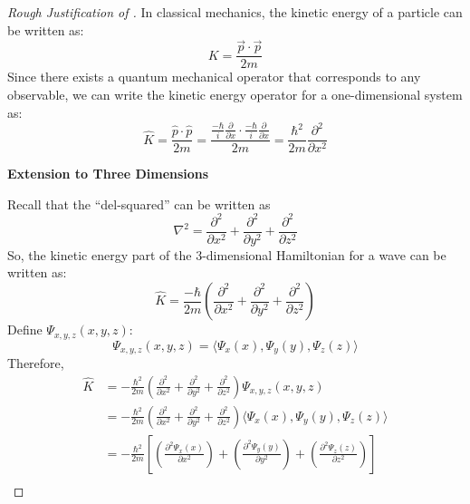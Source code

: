 \begin{proof}[Rough Justification of ]
		In classical mechanics, the kinetic energy of a particle can be written as:
		\begin{equation*}
			K = \frac{\vec{p} \cdot \vec{p}}{2m}
		\end{equation*}
		Since there exists a quantum mechanical operator that corresponds to any observable, we can write the kinetic energy operator for a one-dimensional system as:
		\begin{equation*}
			\widehat{K} = \frac{\hat{p} \cdot \hat{p}}{2m}
			= \frac{\frac{-\hbar}{i} \frac{\partial}{\partial x} \cdot \frac{-\hbar}{i} \frac{\partial}{\partial x}}{2m}
			= \frac{\hbar^{2}}{2m} \frac{\partial^{2}}{\partial x^{2}}
		\end{equation*}
		\begin{center}
			\textbf{\Large Extension to Three Dimensions}
		\end{center}
		Recall that the ``del-squared'' can be written as
		\begin{equation*}
			\nabla^{2} = \frac{\partial^{2}}{\partial x^{2}} + \frac{\partial^{2}}{\partial y^{2}} + \frac{\partial^{2}}{\partial z^{2}}
		\end{equation*}
		So, the kinetic energy part of the 3-dimensional Hamiltonian for a wave can be written as:
		\begin{equation*}
			\widehat{K} =  \frac{-\hbar}{2m} \left( \frac{\partial^{2}}{\partial x^{2}} + \frac{\partial^{2}}{\partial y^{2}} + \frac{\partial^{2}}{\partial z^{2}} \right)
		\end{equation*}
		Define $\Psi_{x,y,z} \left( x,y,z \right)$:
		\begin{equation*}
			\Psi_{x,y,z} \left( x,y,z \right) = \langle \Psi_{x} \left( x \right),\Psi_{y} \left( y \right),\Psi_{z} \left( z \right) \rangle
		\end{equation*}
		Therefore, 
		\begin{align*}
			\widehat{K}
			&= -\frac{\hbar^{2}}{2m} \left( \frac{\partial^{2}}{\partial x^{2}} + \frac{\partial^{2}}{\partial y^{2}}  + \frac{\partial^{2}}{\partial z^{2}} \right) \Psi_{x,y,z} \left( x,y,z \right) \\
			&= -\frac{\hbar^{2}}{2m} \left( \frac{\partial^{2}}{\partial x^{2}} + \frac{\partial^{2}}{\partial y^{2}}  + \frac{\partial^{2}}{\partial z^{2}} \right) \langle \Psi_{x} \left( x \right),\Psi_{y} \left( y \right),\Psi_{z} \left( z \right) \rangle \\
			&= -\frac{\hbar^{2}}{2m} \left[ \left( \frac{\partial^{2} \Psi_{x} \left( x \right)}{\partial x^{2}} \right) + \left(\frac{\partial^{2} \Psi_{y} \left( y \right)}{\partial y^{2}}\right) + \left(\frac{\partial^{2} \Psi_{z} \left( z \right)}{\partial z^{2}}\right) \right] \\
		\end{align*}
	\end{proof}